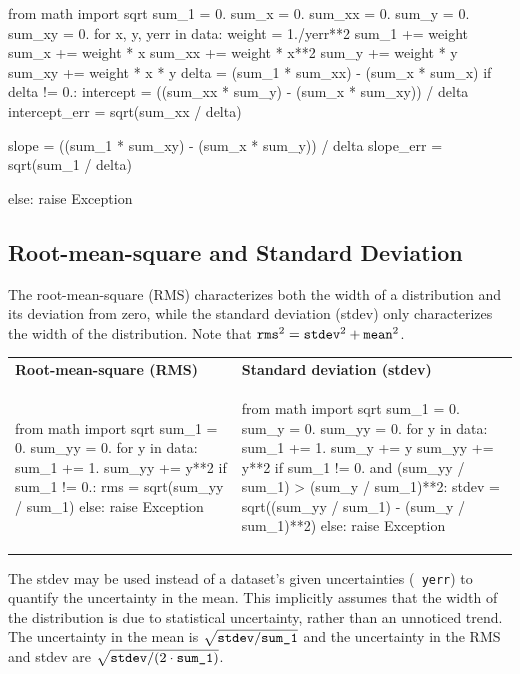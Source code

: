 \documentclass[12pt]{article}
\begin{document}
\begin{python}
from math import sqrt
sum_1 = 0.
sum_x = 0.
sum_xx = 0.
sum_y = 0.
sum_xy = 0.
for x, y, yerr in data:
    weight = 1./yerr**2
    sum_1 += weight
    sum_x += weight * x
    sum_xx += weight * x**2
    sum_y += weight * y
    sum_xy += weight * x * y
delta = (sum_1 * sum_xx) - (sum_x * sum_x)
if delta != 0.:
    intercept = ((sum_xx * sum_y) - (sum_x * sum_xy)) / delta
    intercept_err = sqrt(sum_xx / delta)

    slope = ((sum_1 * sum_xy) - (sum_x * sum_y)) / delta
    slope_err = sqrt(sum_1 / delta)

else: raise Exception
\end{python}

\subsection{Root-mean-square and Standard Deviation}

The root-mean-square (RMS) characterizes both the width of a
distribution and its deviation from zero, while the standard deviation
(stdev) only characterizes the width of the distribution.  Note that
$\mbox{\tt rms}^2 = \mbox{\tt stdev}^2 + \mbox{\tt mean}^2$.

\vspace{0.6 cm}
\begin{tabular}{p{0.45\linewidth} p{0.55\linewidth}}
{\bf Root-mean-square (RMS)} & {\bf Standard deviation (stdev)} \\
\begin{python}
from math import sqrt
sum_1 = 0.
sum_yy = 0.
for y in data:
    sum_1 += 1.
    sum_yy += y**2
if sum_1 != 0.:
    rms = sqrt(sum_yy / sum_1)
else: raise Exception
\end{python} &
\begin{python}
from math import sqrt
sum_1 = 0.
sum_y = 0.
sum_yy = 0.
for y in data:
    sum_1 += 1.
    sum_y += y
    sum_yy += y**2
if sum_1 != 0. and (sum_yy / sum_1) > (sum_y / sum_1)**2:
    stdev = sqrt((sum_yy / sum_1) -
                 (sum_y / sum_1)**2)
else: raise Exception
\end{python}
\end{tabular}

The stdev may be used instead of a dataset's given uncertainties ({\tt
  yerr}) to quantify the uncertainty in the mean.  This implicitly
assumes that the width of the distribution is due to statistical
uncertainty, rather than an unnoticed trend.  The uncertainty in the
mean is $\sqrt{\mbox{\tt stdev} / \mbox{\tt sum\_1}}$ and the
uncertainty in the RMS and stdev are $\sqrt{\mbox{\tt stdev} / (2 \cdot
  \mbox{\tt sum\_1})}$.
\end{document}
